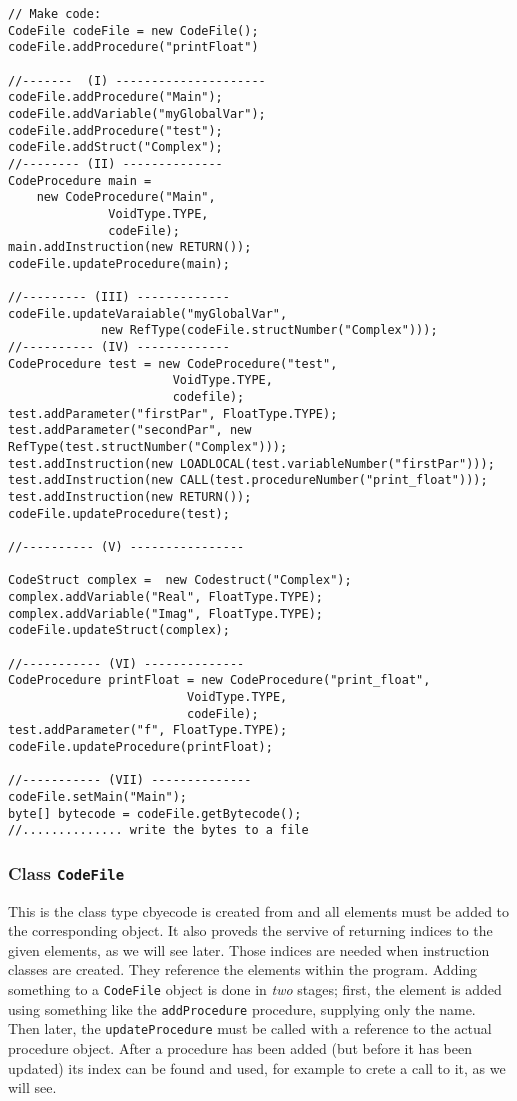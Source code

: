 \documentclass[11pt]{article}
\begin{document}
\lstset{language=java,label= ,caption= ,captionpos=b,numbers=none}
\begin{lstlisting}
// Make code:
CodeFile codeFile = new CodeFile();
codeFile.addProcedure("printFloat")

//-------  (I) ---------------------
codeFile.addProcedure("Main");
codeFile.addVariable("myGlobalVar");
codeFile.addProcedure("test");
codeFile.addStruct("Complex");
//-------- (II) --------------
CodeProcedure main = 
    new CodeProcedure("Main", 
		      VoidType.TYPE, 	     
		      codeFile);
main.addInstruction(new RETURN());
codeFile.updateProcedure(main);

//--------- (III) -------------
codeFile.updateVaraiable("myGlobalVar",
			 new RefType(codeFile.structNumber("Complex")));
//---------- (IV) -------------
CodeProcedure test = new CodeProcedure("test",
				       VoidType.TYPE,
				       codefile);
test.addParameter("firstPar", FloatType.TYPE);
test.addParameter("secondPar", new RefType(test.structNumber("Complex")));
test.addInstruction(new LOADLOCAL(test.variableNumber("firstPar")));
test.addInstruction(new CALL(test.procedureNumber("print_float")));
test.addInstruction(new RETURN());
codeFile.updateProcedure(test);

//---------- (V) ----------------

CodeStruct complex =  new Codestruct("Complex");
complex.addVariable("Real", FloatType.TYPE);
complex.addVariable("Imag", FloatType.TYPE);
codeFile.updateStruct(complex);

//----------- (VI) --------------
CodeProcedure printFloat = new CodeProcedure("print_float",
					     VoidType.TYPE, 
					     codeFile);
test.addParameter("f", FloatType.TYPE);
codeFile.updateProcedure(printFloat);

//----------- (VII) --------------
codeFile.setMain("Main");
byte[] bytecode = codeFile.getBytecode();
//.............. write the bytes to a file
\end{lstlisting}


\subsubsection{Class \texttt{CodeFile}}
\label{sec:orgca50cae}


This is the class type cbyecode is created from and all elements must be
added to the corresponding object. It also proveds the servive of returning
indices to the given elements, as we will see later. Those indices are
needed when instruction classes are created. They reference the elements
within the program. Adding something to a \texttt{CodeFile} object is done in
\emph{two} stages; first, the element is added using something like the
\texttt{addProcedure} procedure, supplying only the name. Then later, the
\texttt{updateProcedure} must be called with a reference to the actual procedure
object. After a procedure has been added (but before it has been updated)
its index can be found and used, for example to crete a call to it, as we
will see.
\end{document}
